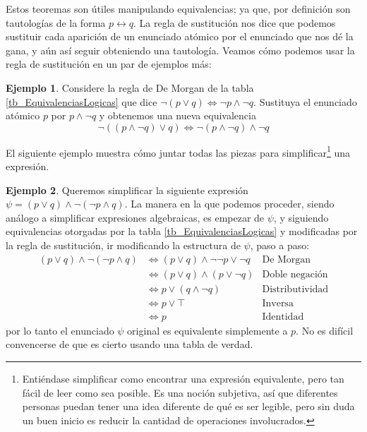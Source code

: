 \documentclass{book}
\theoremstyle{definition}
\newtheorem{ejm}{Ejemplo}[chapter]
\begin{document}
Estos teoremas son útiles manipulando equivalencias; ya que, por definición son tautologías de la forma $p\leftrightarrow q$.
La regla de sustitución nos dice que podemos sustituir cada aparición de un enunciado atómico por el enunciado que nos dé la gana, y aún así seguir obteniendo una tautología.
Veamos cómo podemos usar la regla de sustitución en un par de ejemplos más:
\begin{ejm}
	Considere la regla de De Morgan de la tabla \ref{tb_EquivalenciasLogicas} que dice $\neg(p \vee q) \iff \neg p \wedge \neg q$. Sustituya el enunciado atómico $p$ por $p\wedge \neg q$ y obtenemos una nueva equivalencia \[\neg ((p \wedge \neg q) \vee q) \iff \neg (p \wedge \neg q) \wedge \neg q\]
\end{ejm}
El siguiente ejemplo muestra cómo juntar todas las piezas para simplificar\footnote{Entiéndase simplificar como encontrar una expresión equivalente, pero tan fácil de leer como sea posible. Es una noción subjetiva, así que diferentes personas puedan tener una idea diferente de qué es ser legible, pero sin duda un buen inicio es reducir la cantidad de operaciones involucrados.} una expresión.
\begin{ejm}
	Queremos simplificar la siguiente expresión $\psi = (p\vee q)\wedge \neg(\neg p \wedge q)$. La manera en la que podemos proceder, siendo análogo a simplificar expresiones algebraicas, es empezar de $\psi$, y siguiendo equivalencias otorgadas por la tabla \ref{tb_EquivalenciasLogicas} y modificadas por la regla de sustitución, ir modificando la estructura de $\psi$, paso a paso:
	\begin{align*}
		(p\vee q)\wedge \neg(\neg p \wedge q) & \iff (p \vee q)\wedge \neg \neg p \vee \neg q & \text{De Morgan}
		\\ & \iff (p \vee q)\wedge (p\vee \neg q) & \text{Doble negación}
		\\ & \iff p \vee (q \wedge \neg q) & \text{Distributividad}
		\\ & \iff p \vee \top & \text{Inversa}
		\\ & \iff p & \text{Identidad}
	\end{align*}
	por lo tanto el enunciado $\psi$ original es equivalente simplemente a $p$. No es difícil convencerse de que es cierto usando una tabla de verdad.
\end{ejm}
\end{document}

